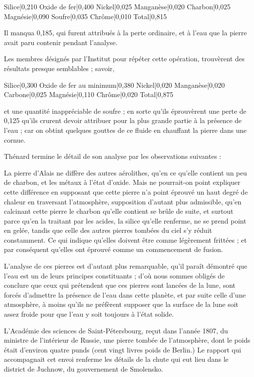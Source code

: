 \documentclass[a4paper, 12pt, oneside, french]{article}
\begin{document}
Silice|0,210  
Oxide de fer|0,400  
Nickel|0,025  
Manganèse|0,020  
Charbon|0,025  
Magnésie|0,090  
Soufre|0,035  
Chrôme|0,010  
Total|0,815

Il manqua 0,185, qui furent attribués à la perte ordinaire, et à l'eau que la pierre avait paru contenir pendant l'analyse.

Les membres désignés par l'Institut pour répéter cette opération, trouvèrent des résultats presque semblables ; savoir,

Silice|0,300  
Oxide de fer au minimum|0,380  
Nickel|0,020  
Manganèse|0,020  
Carbone|0,025   
Magnésie|0,110  
Chrôme|0,020  
Total|0,875

et une quantité inappréciable de soufre ; en sorte qu'ils éprouvèrent une perte de 0,125 qu'ils crurent devoir attribuer pour la plus grande partie à la présence de l'eau ; car on obtint quelques gouttes de ce fluide en chauffant la pierre dans une cornue.

Thénard termine le détail de son analyse par les observations suivantes :

\og La pierre d'Alais ne diffère des autres aérolithes, qu'en ce qu'elle contient un peu de charbon, et les métaux à l'état d'oxide. Mais ne pourrait-on point expliquer cette différence en supposant que cette pierre n'a point éprouvé un haut degré de chaleur en traversant l'atmosphère, supposition d'autant plus admissible, qu'en calcinant cette pierre le charbon qu'elle contient se brûle de suite, et surtout parce qu'en la traitant par les acides, la silice qu'elle renferme, ne se prend point en gelée, tandis que celle des autres pierres tombées du ciel s'y réduit constamment. Ce qui indique qu'elles doivent être comme légèrement frittées ; et par conséquent qu'elles ont éprouvé comme un commencement de fusion. \fg

L'analyse de ces pierres est d'autant plus remarquable, qu'il paraît démontré que l'eau est un de leurs principes constituants ; d'où nous sommes obligés de conclure que ceux qui prétendent que ces pierres sont lancées de la lune, sont forcés d'admettre la présence de l'eau dans cette planète, et par suite celle d'une atmosphère, à moins qu'ils ne préfèrent supposer que la surface de la lune soit assez froide pour que l'eau y soit toujours à l'état solide.

L'Académie des sciences de Saint-Pétersbourg, reçut dans l'année 1807, du ministre de l'intérieur de Russie, une pierre tombée de l'atmosphère, dont le poids était d'environ quatre punds (cent vingt livres poids de Berlin.) Le rapport qui accompagnait cet envoi renferme les détails de la chute qui eut lieu dans le district de Juchnow, du gouvernement de Smolensko.
\end{document}
